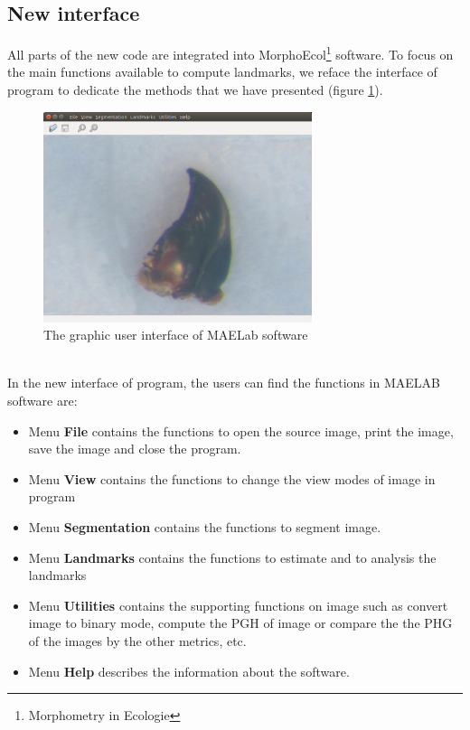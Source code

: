 \subsection{New interface}
All parts of the new code are integrated into MorphoEcol\footnote{Morphometry in Ecologie} software. To focus on the main functions available to compute landmarks, we reface the interface of program to dedicate the methods that we have presented (figure \ref{fig:44}).
\begin{figure}[h!]
\centering
\includegraphics[width=0.7\textwidth]{./images/software}
\caption{The graphic user interface of MAELab software}
\label{fig:44}
\end{figure}~\\
In the new interface of program, the users can find the functions in MAELAB software are:
\begin{itemize}
\item Menu \textbf{File} contains the functions to open the source image, print the image, save the image and close the program.
\item Menu \textbf{View} contains the functions to change the view modes of image in program
\item Menu \textbf{Segmentation} contains the functions to segment image.
\item Menu \textbf{Landmarks} contains the functions to estimate and to analysis the landmarks 
\item Menu \textbf{Utilities} contains the supporting functions on image such as convert image to binary mode, compute the PGH of image or compare the the PHG of the images by the other metrics, etc.
\item Menu \textbf{Help} describes the information about the software.
\end{itemize}
